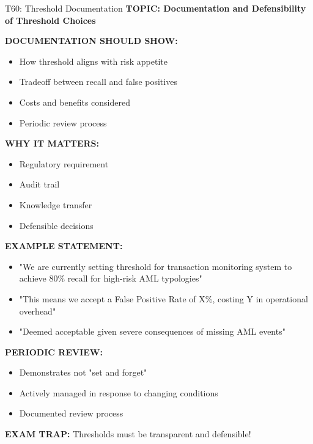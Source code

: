 \documentclass[8pt]{beamer}
\begin{document}
	\begin{frame}{T60: Threshold Documentation}
		\fontsize{6.5}{7.5}\selectfont
		\textbf{TOPIC: Documentation and Defensibility of Threshold Choices}
		
		\vspace{0.1cm}
		\textbf{DOCUMENTATION SHOULD SHOW:}
		\begin{itemize}
			\item How threshold aligns with risk appetite
			\item Tradeoff between recall and false positives
			\item Costs and benefits considered
			\item Periodic review process
		\end{itemize}
		
		\vspace{0.1cm}
		\textbf{WHY IT MATTERS:}
		\begin{itemize}
			\item Regulatory requirement
			\item Audit trail
			\item Knowledge transfer
			\item Defensible decisions
		\end{itemize}
		
		\vspace{0.1cm}
		\textbf{EXAMPLE STATEMENT:}
		\begin{itemize}
			\item "We are currently setting threshold for transaction monitoring system to achieve 80\% recall for high-risk AML typologies"
			\item "This means we accept a False Positive Rate of X\%, costing Y in operational overhead"
			\item "Deemed acceptable given severe consequences of missing AML events"
		\end{itemize}
		
		\vspace{0.1cm}
		\textbf{PERIODIC REVIEW:}
		\begin{itemize}
			\item Demonstrates not "set and forget"
			\item Actively managed in response to changing conditions
			\item Documented review process
		\end{itemize}
		
		\textcolor{myred}{\textbf{EXAM TRAP:}} Thresholds must be \textcolor{myblue}{transparent and defensible}!
	\end{frame}
	
\end{document}
